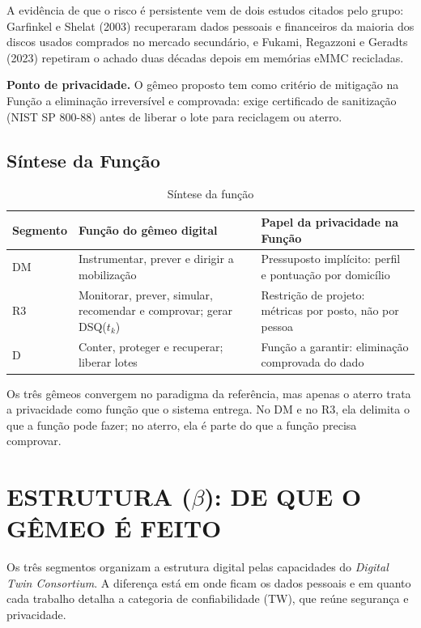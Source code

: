 \documentclass[12pt,a4paper,article,oneside,english,brazil]{abntex2}
\newcommand{\fontetab}[1]{\par\vspace{3pt}{\small\noindent Fonte: #1\par}}
\newcommand{\dsq}[1]{DSQ($t_{#1}$)}
\begin{document}
A evidência de que o risco é persistente vem de dois estudos citados pelo grupo: Garfinkel e Shelat (2003) recuperaram dados pessoais e financeiros da maioria dos discos usados comprados no mercado secundário, e Fukami, Regazzoni e Geradts (2023) repetiram o achado duas décadas depois em memórias eMMC recicladas.

\textbf{Ponto de privacidade.} O gêmeo proposto tem como critério de mitigação na Função a eliminação irreversível e comprovada: exige certificado de sanitização (NIST SP 800-88) antes de liberar o lote para reciclagem ou aterro.

\subsection{Síntese da Função}

\begin{table}[!htbp]
\centering
\caption{Síntese da função}
\label{tab:sintese-funcao}
\small
\begin{tabularx}{\linewidth}{l Y Y}
\hline
\textbf{Segmento} & \textbf{Função do gêmeo digital} & \textbf{Papel da privacidade na Função}\\
\hline
DM & Instrumentar, prever e dirigir a mobilização & Pressuposto implícito: perfil e pontuação por domicílio\\
R3 & Monitorar, prever, simular, recomendar e comprovar; gerar \dsq{k} & Restrição de projeto: métricas por posto, não por pessoa\\
D & Conter, proteger e recuperar; liberar lotes & Função a garantir: eliminação comprovada do dado\\
\hline
\end{tabularx}
\fontetab{Elaborado pelo autor (2026).}
\end{table}

Os três gêmeos convergem no paradigma da referência, mas apenas o aterro trata a privacidade como função que o sistema entrega. No DM e no R3, ela delimita o que a função pode fazer; no aterro, ela é parte do que a função precisa comprovar.

\section{ESTRUTURA (\texorpdfstring{$\beta$}{beta}): DE QUE O GÊMEO É FEITO}

Os três segmentos organizam a estrutura digital pelas capacidades do \textit{Digital Twin Consortium}. A diferença está em onde ficam os dados pessoais e em quanto cada trabalho detalha a categoria de confiabilidade (TW), que reúne segurança e privacidade.
\end{document}

